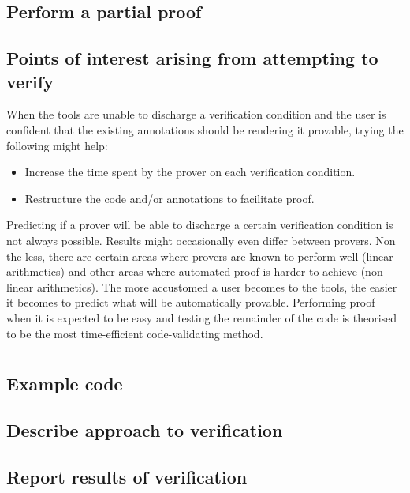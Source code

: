 \documentclass{llncs}
\begin{document}
\subsection{Perform a partial proof}




\subsection{Points of interest arising from attempting to verify}
When the tools are unable to discharge a verification condition and the
user is confident that the existing annotations should be rendering it provable,
trying the following might help:
\begin{itemize}
  \item Increase the time spent by the prover on each verification condition.

  \item Restructure the code and/or annotations to facilitate proof.
\end{itemize}

Predicting if a prover will be able to discharge a certain verification condition is not
always possible. Results might occasionally even differ between provers. Non the less,
there are certain areas where provers are known to perform well (linear arithmetics) and
other areas where automated proof is harder to achieve (non-linear arithmetics). The more
accustomed a user becomes to the tools, the easier it becomes to predict what will be
automatically provable. Performing proof when it is expected to be easy and testing
the remainder of the code is theorised to be the most time-efficient code-validating
method.



\section{}
\subsection{Example code}
\subsection{Describe approach to verification}
\subsection{Report results of verification}
\end{document}
